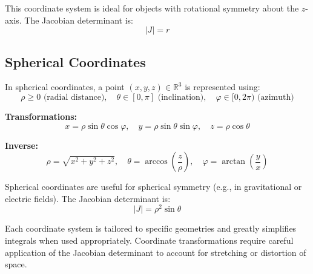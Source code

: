This coordinate system is ideal for objects with rotational symmetry about the \( z \)-axis. The Jacobian determinant is:
\[
|J| = r
\]


\subsection{Spherical Coordinates}

In spherical coordinates, a point \( (x, y, z) \in \mathbb{R}^3 \) is represented using:
\[
\rho \ge 0 \text{ (radial distance)}, \quad \theta \in [0, \pi] \text{ (inclination)}, \quad \varphi \in [0, 2\pi) \text{ (azimuth)}
\]

\textbf{Transformations:}
\[
x = \rho \sin \theta \cos \varphi, \quad y = \rho \sin \theta \sin \varphi, \quad z = \rho \cos \theta
\]

\textbf{Inverse:}
\[
\rho = \sqrt{x^2 + y^2 + z^2}, \quad \theta = \arccos\left(\frac{z}{\rho}\right), \quad \varphi = \arctan\left(\frac{y}{x}\right)
\]

Spherical coordinates are useful for spherical symmetry (e.g., in gravitational or electric fields). The Jacobian determinant is:
\[
|J| = \rho^2 \sin \theta
\]



Each coordinate system is tailored to specific geometries and greatly 
simplifies integrals when used appropriately. 
Coordinate transformations require careful application of the Jacobian 
determinant to account for stretching or distortion of space.

